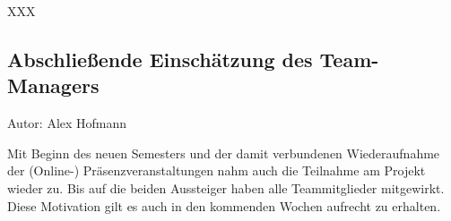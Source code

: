 XXX

\subsection{Abschließende Einschätzung des Team-Managers}
{\small Autor: Alex Hofmann}

\noindent Mit Beginn des neuen Semesters und der damit verbundenen Wiederaufnahme der (Online-) Präsenzveranstaltungen nahm auch die Teilnahme am Projekt wieder zu. Bis auf die beiden Aussteiger haben alle Teammitglieder mitgewirkt. Diese Motivation gilt es auch in den kommenden Wochen aufrecht zu erhalten.
